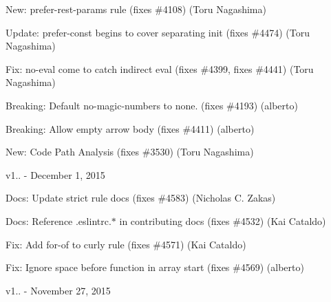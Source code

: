 \begin{DoxyItemize}
\item New\+: {\ttfamily prefer-\/rest-\/params} rule (fixes \#4108) (Toru Nagashima)
\item Update\+: {\ttfamily prefer-\/const} begins to cover separating init (fixes \#4474) (Toru Nagashima)
\item Fix\+: {\ttfamily no-\/eval} come to catch indirect eval (fixes \#4399, fixes \#4441) (Toru Nagashima)
\item Breaking\+: Default no-\/magic-\/numbers to none. (fixes \#4193) (alberto)
\item Breaking\+: Allow empty arrow body (fixes \#4411) (alberto)
\item New\+: Code Path Analysis (fixes \#3530) (Toru Nagashima)
\end{DoxyItemize}

v1.. -\/ December 1, 2015


\begin{DoxyItemize}
\item Docs\+: Update strict rule docs (fixes \#4583) (Nicholas C. Zakas)
\item Docs\+: Reference .eslintrc.$\ast$ in contributing docs (fixes \#4532) (Kai Cataldo)
\item Fix\+: Add for-\/of to {\ttfamily curly} rule (fixes \#4571) (Kai Cataldo)
\item Fix\+: Ignore space before function in array start (fixes \#4569) (alberto)
\end{DoxyItemize}

v1.. -\/ November 27, 2015



